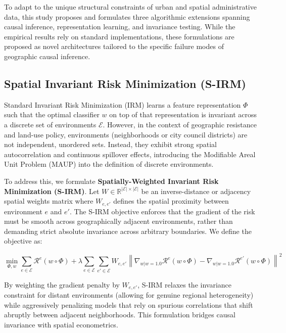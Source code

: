 To adapt to the unique structural constraints of urban and spatial administrative data, this study proposes and formulates three algorithmic extensions spanning causal inference, representation learning, and invariance testing. While the empirical results rely on standard implementations, these formulations are proposed as novel architectures tailored to the specific failure modes of geographic causal inference.

\subsection{Spatial Invariant Risk Minimization (S-IRM)}

Standard Invariant Risk Minimization (IRM) \citep{arjovsky2019invariant} learns a feature representation $\Phi$ such that the optimal classifier $w$ on top of that representation is invariant across a discrete set of environments $\mathcal{E}$. However, in the context of geographic resistance and land-use policy, environments (neighborhoods or city council districts) are not independent, unordered sets. Instead, they exhibit strong spatial autocorrelation and continuous spillover effects, introducing the Modifiable Areal Unit Problem (MAUP) into the definition of discrete environments.

To address this, we formulate \textbf{Spatially-Weighted Invariant Risk Minimization (S-IRM)}. Let $W \in \mathbb{R}^{|\mathcal{E}| \times |\mathcal{E}|}$ be an inverse-distance or adjacency spatial weights matrix where $W_{e, e'}$ defines the spatial proximity between environment $e$ and $e'$. The S-IRM objective enforces that the gradient of the risk must be smooth across geographically adjacent environments, rather than demanding strict absolute invariance across arbitrary boundaries. We define the objective as:

\begin{equation}
\min_{\Phi, w} \sum_{e \in \mathcal{E}} \mathcal{R}^e(w \circ \Phi) + \lambda \sum_{e \in \mathcal{E}} \sum_{e' \in \mathcal{E}} W_{e, e'} \left\| \nabla_{w|w=1.0} \mathcal{R}^e(w \circ \Phi) - \nabla_{w|w=1.0} \mathcal{R}^{e'}(w \circ \Phi) \right\|^2
\end{equation}

By weighting the gradient penalty by $W_{e, e'}$, S-IRM relaxes the invariance constraint for distant environments (allowing for genuine regional heterogeneity) while aggressively penalizing models that rely on spurious correlations that shift abruptly between adjacent neighborhoods. This formulation bridges causal invariance with spatial econometrics.

